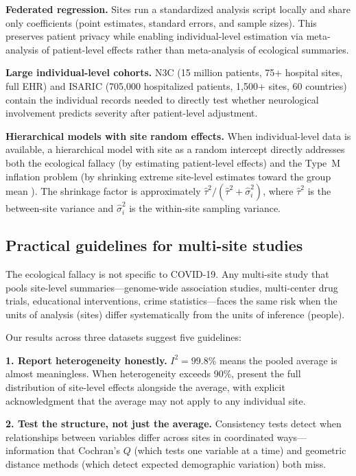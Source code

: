 \documentclass{article}
\begin{document}
\textbf{Federated regression.}  Sites run a standardized analysis script
locally and share only coefficients (point estimates, standard errors, and
sample sizes).  This preserves patient privacy while enabling
individual-level estimation via meta-analysis of patient-level effects
rather than meta-analysis of ecological summaries.

\textbf{Large individual-level cohorts.}  N3C (15 million patients, 75+
hospital sites, full EHR) and ISARIC (705,000 hospitalized patients,
1,500+ sites, 60 countries) contain the individual records needed to
directly test whether neurological involvement predicts severity after
patient-level adjustment.

\textbf{Hierarchical models with site random effects.}  When
individual-level data is available, a hierarchical model with site as a
random intercept directly addresses both the ecological fallacy (by
estimating patient-level effects) and the Type~M inflation problem (by
shrinking extreme site-level estimates toward the group mean
\cite{gelman2012multilevel}).  The shrinkage factor is approximately
$\hat\tau^2 / (\hat\tau^2 + \hat\sigma_i^2)$, where $\hat\tau^2$ is
the between-site variance and $\hat\sigma_i^2$ is the within-site
sampling variance.

\subsection{Practical guidelines for multi-site studies}

The ecological fallacy is not specific to COVID-19.  Any multi-site study
that pools site-level summaries---genome-wide association studies,
multi-center drug trials, educational interventions, crime
statistics---faces the same risk when the units of analysis (sites) differ
systematically from the units of inference (people).

Our results across three datasets suggest five guidelines:

\textbf{1. Report heterogeneity honestly.}  $I^2 = 99.8\%$ means the pooled
average is almost meaningless.  When heterogeneity exceeds 90\%, present the
full distribution of site-level effects alongside the average, with explicit
acknowledgment that the average may not apply to any individual site.

\textbf{2. Test the structure, not just the average.}  Consistency tests
detect when relationships between variables differ across sites in
coordinated ways---information that Cochran's $Q$ (which tests one variable
at a time) and geometric distance methods (which detect expected demographic
variation) both miss.
\end{document}
